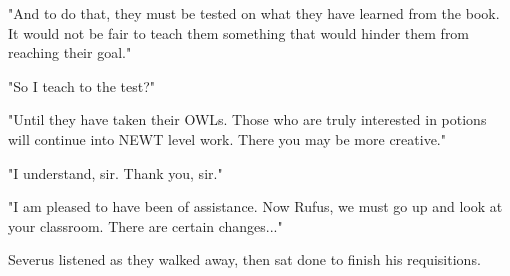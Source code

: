 "And to do that, they must be tested on what they have learned from the book. It would not be fair to teach them something that would hinder them from reaching their goal."

"So I teach to the test?"

"Until they have taken their OWLs. Those who are truly interested in potions will continue into NEWT level work. There you may be more creative."

"I understand, sir. Thank you, sir."

"I am pleased to have been of assistance. Now Rufus, we must go up and look at your classroom. There are certain changes..."

Severus listened as they walked away, then sat done to finish his requisitions.


